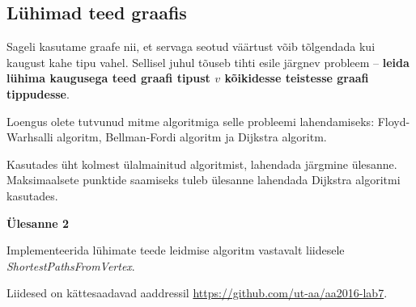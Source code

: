 \documentclass[a4paper]{article}
\begin{document}
{\center
\subsection*{Lühimad teed graafis}
}

Sageli kasutame graafe nii, et servaga seotud väärtust võib tõlgendada kui kaugust kahe tipu vahel. Sellisel juhul tõuseb tihti esile järgnev probleem -- \textbf{leida lühima kaugusega teed graafi tipust $v$ kõikidesse teistesse graafi tippudesse}.

Loengus olete tutvunud mitme algoritmiga selle probleemi lahendamiseks: Floyd-Warhsalli algoritm, Bellman-Fordi algoritm ja Dijkstra algoritm. 

Kasutades üht kolmest ülalmainitud algoritmist, lahendada järgmine ülesanne. Maksimaalsete punktide saamiseks tuleb ülesanne lahendada Dijkstra algoritmi kasutades.

\begin{problem}
\textbf{Ülesanne 2}

Implementeerida lühimate teede leidmise algoritm vastavalt liidesele \textit{ShortestPathsFromVertex}.
\end{problem}

Liidesed on kättesaadavad aaddressil \url{https://github.com/ut-aa/aa2016-lab7}.
\end{document}
